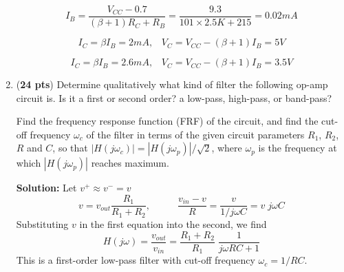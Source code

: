 \begin{enumerate}
  \[
  I_B=\frac{V_{CC}-0.7}{(\beta+1)R_C+R_B}=\frac{9.3}{101\times 2.5K+215}
  =0.02mA
  \]

  \[
  I_C=\beta I_B=2 mA,\;\;\;V_C=V_{CC}-(\beta+1)I_B=5V 
  \]

  \[
  I_C=\beta I_B=2.6mA,\;\;\;V_C=V_{CC}-(\beta+1)I_B=3.5V 
  \]

\item ({\bf 24 pts})
  Determine qualitatively what kind of filter the following op-amp
  circuit is. Is it a first or second order? a low-pass, high-pass, or 
  band-pass? 

  Find the frequency response function (FRF) of the circuit, and find the
  cut-off frequency $\omega_c$ of the filter in terms of the given circuit
  parameters $R_1$, $R_2$, $R$ and $C$, so that
  $|H(j\omega_c)|=|H(j\omega_p)|/\sqrt{2}$, where $\omega_p$ is the
  frequency at which $|H(j\omega_p)|$ reaches maximum.



  {\bf Solution:} Let $v^+\approx v^-=v$
  \[
  v=v_{out}\frac{R_1}{R_1+R_2},\;\;\;\;\;\;\;\;\;\;\frac{v_{in}-v}{R}
  =\frac{v}{1/j\omega C}=v\;j\omega C
  \]
  Substituting $v$ in the first equation into the second, we find
  \[
  H(j\omega)=\frac{v_{out}}{v_{in}}=\frac{R_1+R_2}{R_1}\;\frac{1}{j\omega RC+1}
  \]
  This is a first-order low-pass filter with cut-off frequency $\omega_c=1/RC$.


\end{enumerate}


